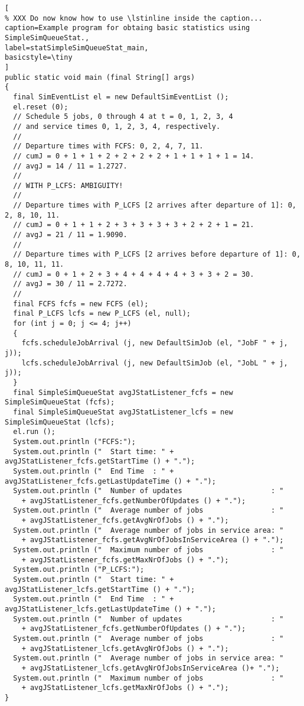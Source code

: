 \documentclass[12pt]{book}
\begin{document}
\begin{lstlisting}[
% XXX Do now know how to use \lstinline inside the caption...
caption=Example program for obtaing basic statistics using SimpleSimQueueStat.,
label=statSimpleSimQueueStat_main,
basicstyle=\tiny
]
public static void main (final String[] args)
{
  final SimEventList el = new DefaultSimEventList ();
  el.reset (0);
  // Schedule 5 jobs, 0 through 4 at t = 0, 1, 2, 3, 4
  // and service times 0, 1, 2, 3, 4, respectively.
  //
  // Departure times with FCFS: 0, 2, 4, 7, 11.
  // cumJ = 0 + 1 + 1 + 2 + 2 + 2 + 2 + 1 + 1 + 1 + 1 = 14.
  // avgJ = 14 / 11 = 1.2727.
  //
  // WITH P_LCFS: AMBIGUITY!
  //
  // Departure times with P_LCFS [2 arrives after departure of 1]: 0, 2, 8, 10, 11.
  // cumJ = 0 + 1 + 1 + 2 + 3 + 3 + 3 + 3 + 2 + 2 + 1 = 21.
  // avgJ = 21 / 11 = 1.9090.
  //
  // Departure times with P_LCFS [2 arrives before departure of 1]: 0, 8, 10, 11, 11.
  // cumJ = 0 + 1 + 2 + 3 + 4 + 4 + 4 + 4 + 3 + 3 + 2 = 30.
  // avgJ = 30 / 11 = 2.7272.    
  //
  final FCFS fcfs = new FCFS (el);
  final P_LCFS lcfs = new P_LCFS (el, null);
  for (int j = 0; j <= 4; j++)
  {
    fcfs.scheduleJobArrival (j, new DefaultSimJob (el, "JobF " + j, j));
    lcfs.scheduleJobArrival (j, new DefaultSimJob (el, "JobL " + j, j));
  }
  final SimpleSimQueueStat avgJStatListener_fcfs = new SimpleSimQueueStat (fcfs);
  final SimpleSimQueueStat avgJStatListener_lcfs = new SimpleSimQueueStat (lcfs);
  el.run ();
  System.out.println ("FCFS:");
  System.out.println ("  Start time: " + avgJStatListener_fcfs.getStartTime () + ".");
  System.out.println ("  End Time  : " + avgJStatListener_fcfs.getLastUpdateTime () + ".");
  System.out.println ("  Number of updates                     : "
    + avgJStatListener_fcfs.getNumberOfUpdates () + ".");
  System.out.println ("  Average number of jobs                : "
    + avgJStatListener_fcfs.getAvgNrOfJobs () + ".");
  System.out.println ("  Average number of jobs in service area: "
    + avgJStatListener_fcfs.getAvgNrOfJobsInServiceArea () + ".");
  System.out.println ("  Maximum number of jobs                : "
    + avgJStatListener_fcfs.getMaxNrOfJobs () + ".");
  System.out.println ("P_LCFS:");
  System.out.println ("  Start time: " + avgJStatListener_lcfs.getStartTime () + ".");
  System.out.println ("  End Time  : " + avgJStatListener_lcfs.getLastUpdateTime () + ".");
  System.out.println ("  Number of updates                     : "
    + avgJStatListener_fcfs.getNumberOfUpdates () + ".");
  System.out.println ("  Average number of jobs                : "
    + avgJStatListener_lcfs.getAvgNrOfJobs () + ".");
  System.out.println ("  Average number of jobs in service area: "
    + avgJStatListener_lcfs.getAvgNrOfJobsInServiceArea ()+ ".");
  System.out.println ("  Maximum number of jobs                : "
    + avgJStatListener_lcfs.getMaxNrOfJobs () + ".");
}
\end{lstlisting}
\end{document}
